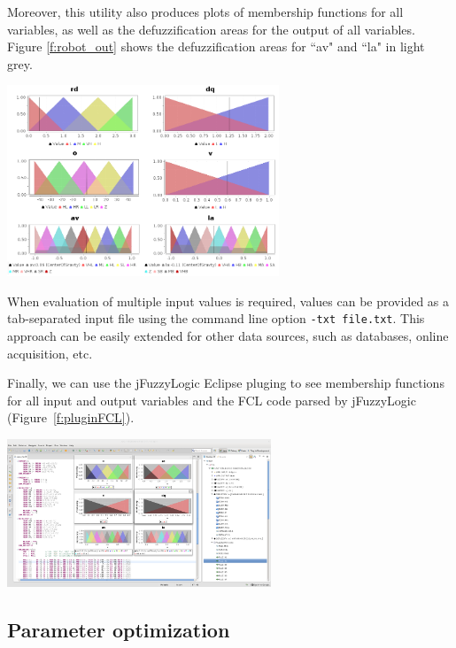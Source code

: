 \documentclass[11pt,twoside]{article}
\begin{document}
\begin{multicols}{2}
Moreover, this utility also produces plots of membership functions for all variables, as well as the defuzzification areas for the output of all variables. Figure \ref{f:robot_out} shows the defuzzification areas for ``av" and ``la" in light grey.

\centerline{\includegraphics[width=3.2in]{./figs/robot_out2.png}}
\vspace*{5pt}
\label{f:robot_out}
\vspace*{5pt}

When evaluation of multiple input values is required, values can be provided as a tab-separated input file using the command line option \texttt{-txt file.txt}.
This approach can be easily extended for other data sources, such as databases, online acquisition, etc.


Finally, we can use the jFuzzyLogic Eclipse pluging to see membership functions for all input and output variables and the FCL code parsed by jFuzzyLogic (Figure~\ref{f:pluginFCL}).

\vspace*{5pt}
\centerline{\includegraphics[width=3.1in]{./figs/plugin_optimized_robot.png}}
\vspace*{5pt}
\label{f:pluginFCL}
\vspace*{5pt}


\subsection{Parameter optimization \label{sec:casOpt}}


\end{multicols}
\end{document}
